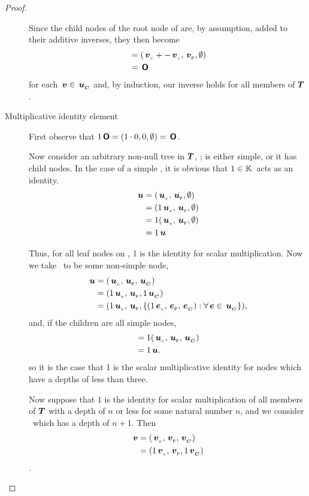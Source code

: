 \begin{proposition}
\begin{proof}
\begin{description}
      Since the child nodes of the root node of  are, by
      assumption, added to their additive inverses, they then become
      \begin{align*}
          &= ({\,\boldsymbol{v}}_{{}_{v}} + -{\,\boldsymbol{v}}_{{}_{v}}, {\,\boldsymbol{v}}_{{}_{\mathsf{P}}}, \emptyset) \\
          &= \,\boldsymbol{\mathsf{O}}
      \end{align*}
      for each \(\,\boldsymbol{v}\in{\,\boldsymbol{u}}_{{}_{\boldsymbol{C}}}\) and, by induction, our inverse
      holds for all members of $\boldsymbol{T}$.

    \item[Multiplicative identity element]\label{multiplicativeidentity}

      First observe that \(1\/\,\boldsymbol{\mathsf{O}} = (1\cdot0,0,\emptyset) = \,\boldsymbol{\mathsf{O}}\).

      Now consider an arbitrary  non-null tree in $\boldsymbol{T}$, ;
       is either simple, or it has child nodes. In the
      case of a simple , it is obvious that \(1 \in
      \mathbb{K}\)\ acts as an identity.
      \begin{align*}
          \,\boldsymbol{u} &= ({\,\boldsymbol{u}}_{{}_{v}}, {\,\boldsymbol{u}}_{{}_{\mathsf{P}}}, \emptyset) \\
          &=  (1 {\,\boldsymbol{u}}_{{}_{v}}, {\,\boldsymbol{u}}_{{}_{\mathsf{P}}}, \emptyset) \\
          &=  1 ( {\,\boldsymbol{u}}_{{}_{v}}, {\,\boldsymbol{u}}_{{}_{\mathsf{P}}},\emptyset) \\
          &= 1 \,\boldsymbol{u}
      \end{align*}

      Thus, for all leaf nodes on , 1 is the identity for
      scalar multiplication. Now we take \ to be some
      non-simple node,
      \begin{align*}
          \,\boldsymbol{u} &= ({\,\boldsymbol{u}}_{{}_{v}}, {\,\boldsymbol{u}}_{{}_{\mathsf{P}}},{\,\boldsymbol{u}}_{{}_{\boldsymbol{C}}}) \\
          &=  (1 {\,\boldsymbol{u}}_{{}_{v}}, {\,\boldsymbol{u}}_{{}_{\mathsf{P}}}, 1 {\,\boldsymbol{u}}_{{}_{\boldsymbol{C}}}) \\
          &=  (1 {\,\boldsymbol{u}}_{{}_{v}}, {\,\boldsymbol{u}}_{{}_{\mathsf{P}}}, \lbrace (1 {\,\boldsymbol{e}}_{{}_{v}}, {\,\boldsymbol{e}}_{{}_{\mathsf{P}}}, {\,\boldsymbol{e}}_{{}_{\boldsymbol{C}}}): \forall \,\boldsymbol{e} \in {\,\boldsymbol{u}}_{{}_{\boldsymbol{C}}} \rbrace),
      \end{align*}
      and, if the children are all simple nodes,
      \begin{align*}
          &=  1 ({\,\boldsymbol{u}}_{{}_{v}}, {\,\boldsymbol{u}}_{{}_{\mathsf{P}}}, {\,\boldsymbol{u}}_{{}_{\boldsymbol{C}}}) \\
          &= 1 \,\boldsymbol{u}.
      \end{align*}
      so it is the case that 1 is the scalar multiplicative identity for nodes which
      have a depths of less than three. 
      
      Now suppose that \(1\) is the identity for scalar multiplication
      of all members of $\boldsymbol{T}$ with a depth of \(n\) or less for some
      natural number \(n\), and we consider \ which has a
      depth of \(n+1\). Then
      \begin{align*}
          \,\boldsymbol{v} &= ({\,\boldsymbol{v}}_{{}_{v}}, {\,\boldsymbol{v}}_{{}_{\mathsf{P}}}, {\,\boldsymbol{v}}_{{}_{\boldsymbol{C}}}) \\
          &=  (1 {\,\boldsymbol{v}}_{{}_{v}}, {\,\boldsymbol{v}}_{{}_{\mathsf{P}}}, 1{\,\boldsymbol{v}}_{{}_{\boldsymbol{C}}})
      \end{align*}.


\end{description}
\end{proof}
\end{proposition}
